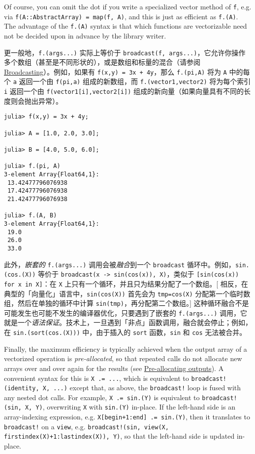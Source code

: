 Of course, you can omit the dot if you write a specialized {\textquotedbl}vector{\textquotedbl} method of \texttt{f}, e.g. via \texttt{f(A::AbstractArray) = map(f, A)}, and this is just as efficient as \texttt{f.(A)}. The advantage of the \texttt{f.(A)} syntax is that which functions are vectorizable need not be decided upon in advance by the library writer.



更一般地，\texttt{f.(args...)} 实际上等价于 \texttt{broadcast(f, args...)}，它允许你操作多个数组（甚至是不同形状的），或是数组和标量的混合（请参阅 \href{@ref}{Broadcasting}）。例如，如果有 \texttt{f(x,y) = 3x + 4y}，那么 \texttt{f.(pi,A)} 将为 \texttt{A} 中的每个 \texttt{a} 返回一个由 \texttt{f(pi,a)} 组成的新数组，而 \texttt{f.(vector1,vector2)} 将为每个索引 \texttt{i} 返回一个由 \texttt{f(vector1[i],vector2[i])} 组成的新向量（如果向量具有不同的长度则会抛出异常）。




\begin{verbatim}
julia> f(x,y) = 3x + 4y;

julia> A = [1.0, 2.0, 3.0];

julia> B = [4.0, 5.0, 6.0];

julia> f.(pi, A)
3-element Array{Float64,1}:
 13.42477796076938
 17.42477796076938
 21.42477796076938

julia> f.(A, B)
3-element Array{Float64,1}:
 19.0
 26.0
 33.0
\end{verbatim}



此外，\emph{嵌套的} \texttt{f.(args...)} 调用会被\emph{融合}到一个 \texttt{broadcast} 循环中。例如，\texttt{sin.(cos.(X))} 等价于 \texttt{broadcast(x -> sin(cos(x)), X)}，类似于 \texttt{[sin(cos(x)) for x in X]}：在 \texttt{X} 上只有一个循环，并且只为结果分配了一个数组。[ 相反，在典型的「向量化」语言中，\texttt{sin(cos(X))} 首先会为 \texttt{tmp=cos(X)} 分配第一个临时数组，然后在单独的循环中计算 \texttt{sin(tmp)}，再分配第二个数组。] 这种循环融合不是可能发生也可能不发生的编译器优化，只要遇到了嵌套的 \texttt{f.(args...)} 调用，它就是一个\emph{语法保证}。技术上，一旦遇到「非点」函数调用，融合就会停止；例如，在 \texttt{sin.(sort(cos.(X)))} 中，由于插入的 \texttt{sort} 函数，\texttt{sin} 和 \texttt{cos} 无法被合并。



Finally, the maximum efficiency is typically achieved when the output array of a vectorized operation is \emph{pre-allocated}, so that repeated calls do not allocate new arrays over and over again for the results (see \href{@ref}{Pre-allocating outputs}). A convenient syntax for this is \texttt{X .= ...}, which is equivalent to \texttt{broadcast!(identity, X, ...)} except that, as above, the \texttt{broadcast!} loop is fused with any nested {\textquotedbl}dot{\textquotedbl} calls. For example, \texttt{X .= sin.(Y)} is equivalent to \texttt{broadcast!(sin, X, Y)}, overwriting \texttt{X} with \texttt{sin.(Y)} in-place. If the left-hand side is an array-indexing expression, e.g. \texttt{X[begin+1:end] .= sin.(Y)}, then it translates to \texttt{broadcast!} on a \texttt{view}, e.g. \texttt{broadcast!(sin, view(X, firstindex(X)+1:lastindex(X)), Y)}, so that the left-hand side is updated in-place.



